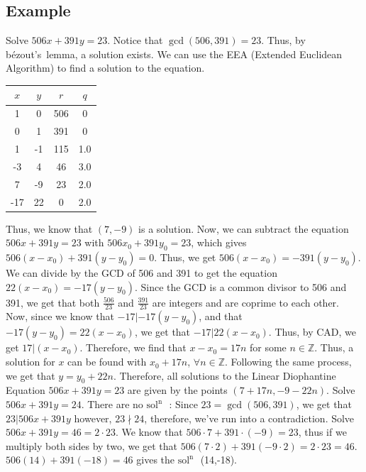 \documentclass[oneside]{book}
\newcommand\tab[1][1cm]{\hspace*{#1}}
\newcommand\nextline{\newline\tab}
\newcommand\soln{$\text{sol}^\text{n}\text{ }$}
\begin{document}
\subsection{Example}
Solve $506x + 391y = 23$. Notice that $\gcd(506,391)=23$. Thus, by b\'ezout's\ lemma, a solution exists. We can use the EEA (Extended Euclidean Algorithm) to find a solution to the equation. 
\newline
\begin{center}
\begin{tabular}{|c|c|c|c|}
\hline
$x$ & $y$ & $r$ & $q$ \\
\hline
\hline
1 & 0 & 506 & 0 \\
0 & 1 & 391 & 0 \\
1 & -1 & 115 & 1.0 \\
-3 & 4 & 46 & 3.0 \\
7 & -9 & 23 & 2.0 \\
-17 & 22 & 0 & 2.0 \\
\hline
\end{tabular}
\end{center}
\tab
Thus, we know that $(7,-9)$ is a solution. Now, we can subtract the equation $506x+391y=23$ with $506x_0 + 391y_0=23$, which gives $506(x-x_0) + 391(y-y_0) = 0$. Thus, we get $506(x-x_0) = -391(y-y_0)$. We can divide by the GCD of 506 and 391 to get the equation $22(x-x_0) = -17(y-y_0)$. Since the GCD is a common divisor to 506 and 391, we get that both $\frac{506}{23}$ and $\frac{391}{23}$ are integers and are coprime to each other. Now, since we know that $-17\lvert -17(y-y_0)$, and that $-17(y-y_0)=22(x-x_0)$, we get that $-17\lvert 22(x-x_0)$. Thus, by CAD, we get $17\lvert (x-x_0)$. Therefore, we find that $x-x_0 = 17n$ for some $n\in\mathbb{Z}$. Thus, a solution for $x$ can be found with $x_0 + 17n$, $\forall n\in\mathbb{Z}$.
\nextline
Following the same process, we get that $y=y_0+22n$. Therefore, all solutions to the Linear Diophantine Equation $506x + 391y = 23$ are given by the points $(7 + 17n, -9 - 22n)$.
\newline
\newline
Solve $506x + 391y = 24$.
\nextline
There are no \soln: Since $23=\gcd(506,391)$, we get that $23\lvert 506x+391y$ however, $23\nmid 24$, therefore, we've run into a contradiction.
\newline
\newline
Solve $506x + 391y = 46 = 2\cdot23$. We know that $506\cdot7 + 391\cdot(-9) = 23$, thus if we multiply both sides by two, we get that $506(7\cdot2) + 391(-9\cdot2) = 2\cdot23 = 46$. $506(14) + 391(-18) = 46$ gives the \soln (14,-18).
\end{document}
